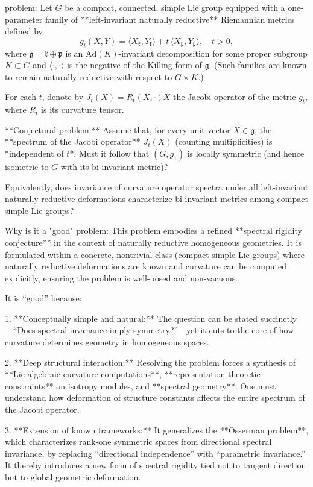problem:  
Let \( G \) be a compact, connected, simple Lie group equipped with a one-parameter family of **left-invariant naturally reductive** Riemannian metrics defined by  
\[
g_t(X,Y) = \langle X_{\mathfrak{k}}, Y_{\mathfrak{k}} \rangle + t \, \langle X_{\mathfrak{p}}, Y_{\mathfrak{p}} \rangle , \quad t > 0,
\]
where \(\mathfrak{g} = \mathfrak{k} \oplus \mathfrak{p}\) is an \( \mathrm{Ad}(K)\)-invariant decomposition for some proper subgroup \(K \subset G\) and \(\langle \cdot,\cdot\rangle\) is the negative of the Killing form of \(\mathfrak{g}\). (Such families are known to remain naturally reductive with respect to \(G \times K\).)

For each \(t\), denote by \(J_t(X) = R_t(X, \cdot)X\) the Jacobi operator of the metric \(g_t\), where \(R_t\) is its curvature tensor.  

**Conjectural problem:**   
Assume that, for every unit vector \(X \in \mathfrak{g}\), the **spectrum of the Jacobi operator** \(J_t(X)\) (counting multiplicities) is *independent of \(t\)*.  
Must it follow that \((G,g_1)\) is locally symmetric (and hence isometric to \(G\) with its bi-invariant metric)?  

Equivalently, does invariance of curvature operator spectra under all left-invariant naturally reductive deformations characterize bi-invariant metrics among compact simple Lie groups?

Why is it a "good" problem:  
This problem embodies a refined **spectral rigidity conjecture** in the context of naturally reductive homogeneous geometries. It is formulated within a concrete, nontrivial class (compact simple Lie groups) where naturally reductive deformations are known and curvature can be computed explicitly, ensuring the problem is well-posed and non-vacuous.

It is “good” because:

1. **Conceptually simple and natural:**  
   The question can be stated succinctly—“Does spectral invariance imply symmetry?”—yet it cuts to the core of how curvature determines geometry in homogeneous spaces.

2. **Deep structural interaction:**  
   Resolving the problem forces a synthesis of **Lie algebraic curvature computations**, **representation-theoretic constraints** on isotropy modules, and **spectral geometry**. One must understand how deformation of structure constants affects the entire spectrum of the Jacobi operator.

3. **Extension of known frameworks:**  
   It generalizes the **Osserman problem**, which characterizes rank-one symmetric spaces from directional spectral invariance, by replacing “directional independence” with “parametric invariance.” It thereby introduces a new form of spectral rigidity tied not to tangent direction but to global geometric deformation.

